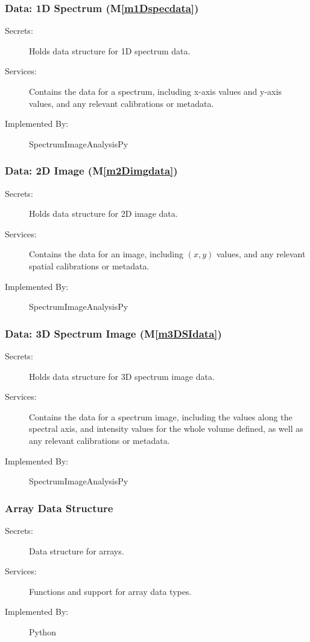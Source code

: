 \documentclass[12pt, titlepage]{article}
\newcommand{\mref}[1]{M\ref{#1}}
\newcommand{\progname}{SpectrumImageAnalysisPy}
\begin{document}
\subsubsection{Data: 1D Spectrum (\mref{m1Dspecdata})}
\begin{description}
	\item[Secrets:]Holds data structure for 1D spectrum data.
	\item[Services:]Contains the data for a spectrum, including x-axis values and
y-axis values, and any relevant calibrations or metadata.
	\item[Implemented By:] \progname
\end{description}

\subsubsection{Data: 2D Image (\mref{m2Dimgdata})}
\begin{description}
	\item[Secrets:]Holds data structure for 2D image data.
	\item[Services:]Contains the data for an image, including $(x,y)$ values, and
any relevant spatial calibrations or metadata.
	\item[Implemented By:] \progname
\end{description}

\subsubsection{Data: 3D Spectrum Image (\mref{m3DSIdata})}
\begin{description}
	\item[Secrets:]Holds data structure for 3D spectrum image data.
	\item[Services:]Contains the data for a spectrum image, including the values
along the spectral axis, and intensity values for the whole volume defined, as
well as any relevant calibrations or metadata.
	\item[Implemented By:] \progname
\end{description}

\subsubsection{Array Data Structure}
\begin{description}
	\item[Secrets:]Data structure for arrays.
	\item[Services:]Functions and support for array data types.
	\item[Implemented By:] Python
\end{description}
\end{document}

